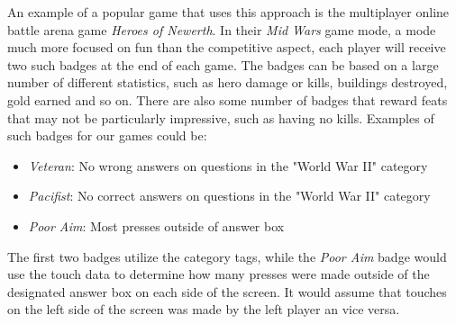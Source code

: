 An example of a popular game that uses this approach is the multiplayer online battle arena game \emph{Heroes of Newerth}\citep{Newerth}. In their \emph{Mid Wars} game mode, a mode much more focused on fun than the competitive aspect, each player will receive two such badges at the end of each game. The badges can be based on a large number of different statistics, such as hero damage or kills, buildings destroyed, gold earned and so on\citep{MidWars}. There are also some number of badges that reward feats that may not be particularly impressive, such as having no kills. Examples of such badges for our games could be:
\begin{itemize}
	\item \emph{Veteran}: No wrong answers on questions in the "World War II" category
	\item \emph{Pacifist}: No correct answers on questions in the "World War II" category
	\item \emph{Poor Aim}: Most presses outside of answer box
\end{itemize}

The first two badges utilize the category tags, while the \emph{Poor Aim} badge would use the touch data to determine how many presses were made outside of the designated answer box on each side of the screen. It would assume that touches on the left side of the screen was made by the left player an vice versa.